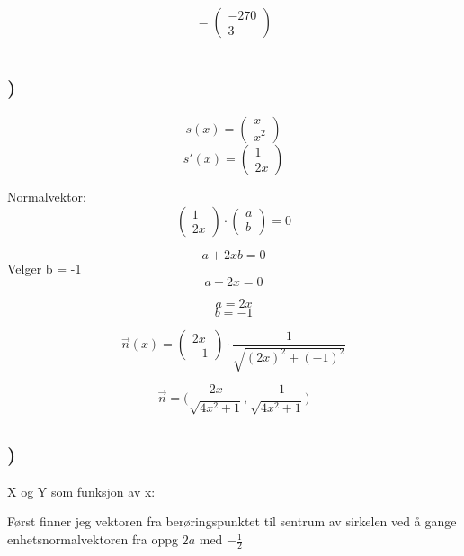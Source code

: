 \documentclass[a4paper,10pt,norsk]{article}
\begin{document}
\[=\left(\begin{matrix} -270\\3 \end{matrix}\right)\]

\section{}

\subsection{)}

\begin{center}

\[s(x) = \left(\begin{matrix} x\\x^{2} \end{matrix}\right)\]
\[s'(x) = \left(\begin{matrix} 1\\2x \end{matrix}\right)\]

Normalvektor:
\[\left(\begin{matrix} 1\\2x \end{matrix}\right) \cdot \left(\begin{matrix} a\\b \end{matrix}\right) = 0\]

\[a + 2xb = 0\]
Velger b = -1
\[a - 2x = 0\]

\[a = 2x\]
\[b = -1\]

\[\vec{n}(x) = \left(\begin{matrix} 2x\\-1 \end{matrix}\right) \cdot \frac{1}{\sqrt{(2x)^{2} + (-1)^{2}}}\]

\[\vec{n} = \Bigg( \frac{2x}{\sqrt{4x^{2} + 1}}, \frac{-1}{\sqrt{4x^{2} + 1}} \Bigg)\]

\end{center}

\subsection{)}
X og Y som funksjon av x:

Først finner jeg vektoren fra berøringspunktet til sentrum av sirkelen ved å gange enhetsnormalvektoren fra oppg $2a$ med $-\frac{1}{2}$
\end{document}
